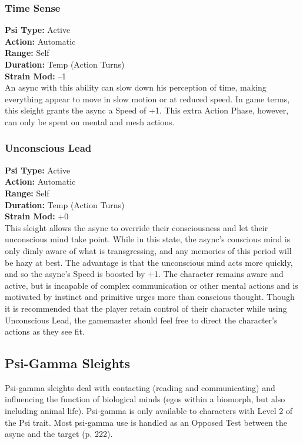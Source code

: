 \subsubsection{Time Sense} \textbf{Psi Type:} Active \\ \textbf{Action:} Automatic \\ \textbf{Range:} Self \\ \textbf{Duration:} Temp (Action Turns) \\ \textbf{Strain Mod:} –1 \\ An async with this ability can slow down his perception of time, making everything appear to move in slow motion or at reduced speed. In game terms, this sleight grants the async a Speed of +1. This extra Action Phase, however, can only be spent on mental and mesh actions. 

\subsubsection{Unconscious Lead} \textbf{Psi Type:} Active \\ \textbf{Action:} Automatic \\ \textbf{Range:} Self \\ \textbf{Duration:} Temp (Action Turns) \\ \textbf{Strain Mod:} +0 \\ This sleight allows the async to override their consciousness and let their unconscious mind take point. While in this state, the async’s conscious mind is only dimly aware of what is transgressing, and any memories of this period will be hazy at best. The advantage is that the unconscious mind acts more quickly, and so the async’s Speed is boosted by +1. The character remains aware and active, but is incapable of complex communication or other mental actions and is motivated by instinct and primitive urges more than conscious thought. Though it is recommended that the player retain control of their character while using Unconscious Lead, the gamemaster should feel free to direct the character’s actions as they see fit. 



\subsection{Psi-Gamma Sleights} Psi-gamma sleights deal with contacting (reading and communicating) and influencing the function of biological minds (egos within a biomorph, but also including animal life). Psi-gamma is only available to characters with Level 2 of the Psi trait. Most psi-gamma use is handled as an Opposed Test between the async and the target (p. 222). 

